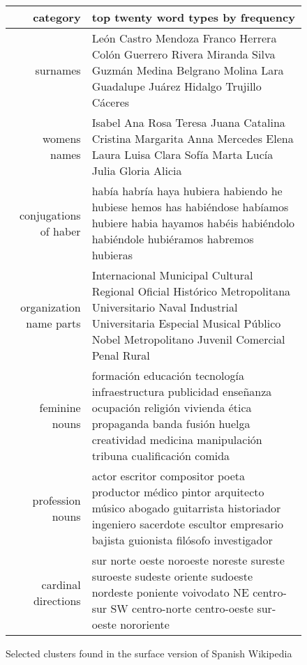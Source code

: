 \begin{figure*}[t!]
  \begin{tabular}{|r|p{10cm}|}
    \hline
    category  & top twenty word types by frequency \\
    \hline
    surnames & León Castro Mendoza Franco Herrera Colón Guerrero Rivera Miranda
    Silva Guzmán Medina Belgrano Molina Lara Guadalupe Juárez Hidalgo Trujillo
    Cáceres \\
    \hline
    womens names & Isabel Ana Rosa Teresa Juana Catalina Cristina Margarita
    Anna Mercedes Elena Laura Luisa Clara Sofía Marta Lucía Julia Gloria Alicia
    \\
    \hline
    conjugations of haber & había habría haya hubiera habiendo he hubiese hemos
    has habiéndose habíamos hubiere habia hayamos habéis habiéndolo habiéndole
    hubiéramos habremos hubieras \\
    \hline
    organization name parts & Internacional Municipal Cultural Regional
    Oficial Histórico Metropolitana Universitario Naval Industrial
    Universitaria Especial Musical Público Nobel Metropolitano Juvenil
    Comercial Penal Rural \\
    \hline
    feminine nouns & formación educación tecnología infraestructura publicidad
    enseñanza ocupación religión vivienda ética propaganda banda fusión huelga
    creatividad medicina manipulación tribuna cualificación comida \\
    \hline
    profession nouns & actor escritor compositor poeta productor médico pintor
    arquitecto músico abogado guitarrista historiador ingeniero sacerdote
    escultor empresario bajista guionista filósofo investigador \\
    \hline
    cardinal directions & sur norte oeste noroeste noreste sureste suroeste
    sudeste oriente sudoeste nordeste poniente voivodato NE centro-sur SW
    centro-norte centro-oeste sur-oeste nororiente \\
    \hline
  \end{tabular}
\caption{Selected clusters found in the surface version of Spanish Wikipedia}
\label{fig:clusters-wikipedia-surface}
\end{figure*}

